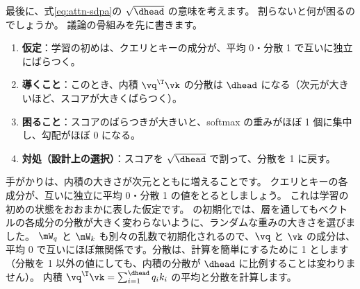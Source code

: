 最後に、式\eqref{eq:attn-sdpa}の $\sqrt{\dhead}$ の意味を考えます。
割らないと何が困るのでしょうか。
議論の骨組みを先に書きます。
\begin{enumerate}
\item \textbf{仮定}：学習の初めは、クエリとキーの成分が、平均 0・分散 1 で互いに独立にばらつく。
\item \textbf{導くこと}：このとき、内積 $\vq^\T\vk$ の分散は $\dhead$ になる（次元が大きいほど、スコアが大きくばらつく）。
\item \textbf{困ること}：スコアのばらつきが大きいと、softmax の重みがほぼ 1 個に集中し、勾配がほぼ 0 になる。
\item \textbf{対処（設計上の選択）}：スコアを $\sqrt{\dhead}$ で割って、分散を 1 に戻す。
\end{enumerate}

手がかりは、内積の大きさが次元とともに増えることです。
クエリとキーの各成分が、互いに独立に平均 0・分散 1 の値をとるとしましょう。
これは学習の初めの状態をおおまかに表した仮定です。
の初期化では、層を通してもベクトルの各成分の分散が大きく変わらないように、ランダムな重みの大きさを選びました。
$\mW_q$ と $\mW_k$ も別々の乱数で初期化されるので、$\vq$ と $\vk$ の成分は、平均 0 で互いにほぼ無関係です。分散は、計算を簡単にするために 1 とします（分散を 1 以外の値にしても、内積の分散が $\dhead$ に比例することは変わりません）。
内積 $\vq^\T\vk=\sum_{i=1}^{\dhead}q_ik_i$ の平均と分散を計算します。

